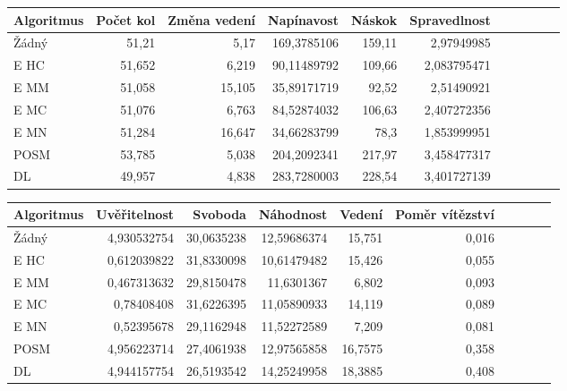 \begin{table*}[b]\footnotesize
\vspace*{0mm}
\caption{{\label{tab-lcm}} Porovnání metrik zábavnosti u jednotlivých algoritmů ve hře Ztracená města. Metriky změna vedení a svoboda se maximalizují, zbytek minimalizuje.}
\vspace*{0mm}
\label{shadowtable}
\begin{center}
\begin{tabular}{| l || r | r | r | r | r | r | r | r | r | r |}
\hline
Algoritmus & Počet kol	& Změna vedení & Napínavost & Náskok & Spravedlnost\\
\hline
\hline
Žádný & 51,21 & 5,17 & 169,3785106 & 159,11 & 2,97949985 \\ \hline  
E HC & 51,652 & 6,219 & 90,11489792 & 109,66 & 2,083795471 \\ \hline  
E MM & 51,058 & 15,105 & 35,89171719 & 92,52 & 2,51490921 \\ \hline  
E MC & 51,076 & 6,763 & 84,52874032 & 106,63 & 2,407272356 \\ \hline  
E MN & 51,284 & 16,647 & 34,66283799 & 78,3 & 1,853999951 \\ \hline  
POSM & 53,785 & 5,038 & 204,2092341 & 217,97 & 3,458477317 \\ \hline  
DL & 49,957 & 4,838 & 283,7280003 & 228,54 & 3,401727139 \\ \hline  
\end{tabular}
\end{center}
\begin{center}
\begin{tabular}{| l || r | r | r | r | r | r | r | r | r |}
\hline
Algoritmus & Uvěřitelnost & Svoboda & Náhodnost & Vedení &	Poměr vítězství \\
\hline
\hline
Žádný & 4,930532754 & 30,0635238 & 12,59686374 & 15,751 & 0,016 \\ \hline  
E HC & 0,612039822 & 31,8330098 & 10,61479482 & 15,426 & 0,055 \\ \hline  
E MM & 0,467313632 & 29,8150478 & 11,6301367 & 6,802 & 0,093 \\ \hline  
E MC & 0,78408408 & 31,6226395 & 11,05890933 & 14,119 & 0,089 \\ \hline  
E MN & 0,52395678 & 29,1162948 & 11,52272589 & 7,209 & 0,081 \\ \hline  
POSM & 4,956223714 & 27,4061938 & 12,97565858 & 16,7575 & 0,358 \\ \hline  
DL & 4,944157754 & 26,5193542 & 14,25249958 & 18,3885 & 0,408 \\ \hline  
\end{tabular}
\end{center}
\end{table*}

